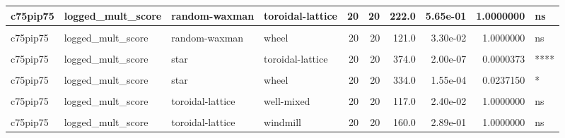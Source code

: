 \documentclass[
]{book}
\begin{document}
\begin{table}
\begin{tabular}{l|l|l|l|r|r|r|r|r|l}
\hline
c75pip75 & logged\_mult\_score & random-waxman & toroidal-lattice & 20 & 20 & 222.0 & 5.65e-01 & 1.0000000 & ns\\
\hline
\cellcolor{gray!6}{c75pip75} & \cellcolor{gray!6}{logged\_mult\_score} & \cellcolor{gray!6}{random-waxman} & \cellcolor{gray!6}{well-mixed} & \cellcolor{gray!6}{20} & \cellcolor{gray!6}{20} & \cellcolor{gray!6}{129.0} & \cellcolor{gray!6}{5.60e-02} & \cellcolor{gray!6}{1.0000000} & \cellcolor{gray!6}{ns}\\
\hline
c75pip75 & logged\_mult\_score & random-waxman & wheel & 20 & 20 & 121.0 & 3.30e-02 & 1.0000000 & ns\\
\hline
\cellcolor{gray!6}{c75pip75} & \cellcolor{gray!6}{logged\_mult\_score} & \cellcolor{gray!6}{random-waxman} & \cellcolor{gray!6}{windmill} & \cellcolor{gray!6}{20} & \cellcolor{gray!6}{20} & \cellcolor{gray!6}{182.0} & \cellcolor{gray!6}{6.40e-01} & \cellcolor{gray!6}{1.0000000} & \cellcolor{gray!6}{ns}\\
\hline
c75pip75 & logged\_mult\_score & star & toroidal-lattice & 20 & 20 & 374.0 & 2.00e-07 & 0.0000373 & ****\\
\hline
\cellcolor{gray!6}{c75pip75} & \cellcolor{gray!6}{logged\_mult\_score} & \cellcolor{gray!6}{star} & \cellcolor{gray!6}{well-mixed} & \cellcolor{gray!6}{20} & \cellcolor{gray!6}{20} & \cellcolor{gray!6}{315.0} & \cellcolor{gray!6}{1.00e-03} & \cellcolor{gray!6}{0.1430000} & \cellcolor{gray!6}{ns}\\
\hline
c75pip75 & logged\_mult\_score & star & wheel & 20 & 20 & 334.0 & 1.55e-04 & 0.0237150 & *\\
\hline
\cellcolor{gray!6}{c75pip75} & \cellcolor{gray!6}{logged\_mult\_score} & \cellcolor{gray!6}{star} & \cellcolor{gray!6}{windmill} & \cellcolor{gray!6}{20} & \cellcolor{gray!6}{20} & \cellcolor{gray!6}{358.0} & \cellcolor{gray!6}{4.10e-06} & \cellcolor{gray!6}{0.0007663} & \cellcolor{gray!6}{***}\\
\hline
c75pip75 & logged\_mult\_score & toroidal-lattice & well-mixed & 20 & 20 & 117.0 & 2.40e-02 & 1.0000000 & ns\\
\hline
\cellcolor{gray!6}{c75pip75} & \cellcolor{gray!6}{logged\_mult\_score} & \cellcolor{gray!6}{toroidal-lattice} & \cellcolor{gray!6}{wheel} & \cellcolor{gray!6}{20} & \cellcolor{gray!6}{20} & \cellcolor{gray!6}{106.0} & \cellcolor{gray!6}{1.00e-02} & \cellcolor{gray!6}{1.0000000} & \cellcolor{gray!6}{ns}\\
\hline
c75pip75 & logged\_mult\_score & toroidal-lattice & windmill & 20 & 20 & 160.0 & 2.89e-01 & 1.0000000 & ns\\

\end{tabular}
\end{table}
\end{document}
